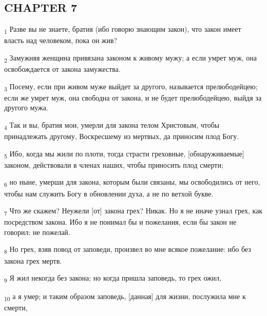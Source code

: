 \subsection{CHAPTER 7}
\begin{tcolorbox}
\textsubscript{1} Разве вы не знаете, братия (ибо говорю знающим закон), что закон имеет власть над человеком, пока он жив?
\end{tcolorbox}
\begin{tcolorbox}
\textsubscript{2} Замужняя женщина привязана законом к живому мужу; а если умрет муж, она освобождается от закона замужества.
\end{tcolorbox}
\begin{tcolorbox}
\textsubscript{3} Посему, если при живом муже выйдет за другого, называется прелюбодейцею; если же умрет муж, она свободна от закона, и не будет прелюбодейцею, выйдя за другого мужа.
\end{tcolorbox}
\begin{tcolorbox}
\textsubscript{4} Так и вы, братия мои, умерли для закона телом Христовым, чтобы принадлежать другому, Воскресшему из мертвых, да приносим плод Богу.
\end{tcolorbox}
\begin{tcolorbox}
\textsubscript{5} Ибо, когда мы жили по плоти, тогда страсти греховные, [обнаруживаемые] законом, действовали в членах наших, чтобы приносить плод смерти;
\end{tcolorbox}
\begin{tcolorbox}
\textsubscript{6} но ныне, умерши для закона, которым были связаны, мы освободились от него, чтобы нам служить Богу в обновлении духа, а не по ветхой букве.
\end{tcolorbox}
\begin{tcolorbox}
\textsubscript{7} Что же скажем? Неужели [от] закона грех? Никак. Но я не иначе узнал грех, как посредством закона. Ибо я не понимал бы и пожелания, если бы закон не говорил: не пожелай.
\end{tcolorbox}
\begin{tcolorbox}
\textsubscript{8} Но грех, взяв повод от заповеди, произвел во мне всякое пожелание: ибо без закона грех мертв.
\end{tcolorbox}
\begin{tcolorbox}
\textsubscript{9} Я жил некогда без закона; но когда пришла заповедь, то грех ожил,
\end{tcolorbox}
\begin{tcolorbox}
\textsubscript{10} а я умер; и таким образом заповедь, [данная] для жизни, послужила мне к смерти,
\end{tcolorbox}
